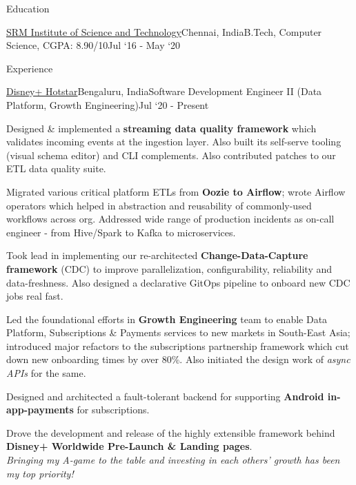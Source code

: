 \documentclass{resume}
\begin{document}
\begin{rSection}{Education}
  \begin{rEmptySubsection}{\href{https://www.srmist.edu.in/}{SRM Institute of Science and Technology}}{Chennai, India}{B.Tech, Computer Science, CGPA: 8.90/10}{Jul `16 - May `20}
  \end{rEmptySubsection}

\end{rSection}

\begin{rSection}{Experience}

  \begin{rSubsection}{\href{https://tech.hotstar.com/}{Disney+ Hotstar}}{Bengaluru, India}{Software Development Engineer II (Data Platform, Growth Engineering)}{Jul `20 - Present}
    \item Designed \& implemented a \textbf{streaming data quality framework} which validates incoming events at the ingestion layer. Also built its self-serve tooling (visual schema editor) and CLI complements. Also contributed patches to our ETL data quality suite.
    \item Migrated various critical platform ETLs from \textbf{Oozie to Airflow}; wrote Airflow operators which helped in abstraction and reusability of commonly-used workflows across org. Addressed wide range of production incidents as on-call engineer - from Hive/Spark to Kafka to microservices.
    \item Took lead in implementing our re-architected \textbf{Change-Data-Capture framework} (CDC) to improve parallelization, configurability, reliability and data-freshness. Also designed a declarative GitOps pipeline to onboard new CDC jobs real fast.
    \item Led the foundational efforts in \textbf{Growth Engineering} team to enable Data Platform, Subscriptions \& Payments services to new markets in South-East Asia; introduced major refactors to the subscriptions partnership framework which cut down new onboarding times by over 80\%. Also initiated the design work of \textit{async APIs} for the same.
    \item Designed and architected a fault-tolerant backend for supporting \textbf{Android in-app-payments} for subscriptions.
    \item Drove the development and release of the highly extensible framework behind \textbf{Disney+ Worldwide Pre-Launch \& Landing pages}.\\
     \textit{Bringing my A-game to the table and investing in each others' growth has been my top priority!}
  \end{rSubsection}


\end{rSection}
\end{document}
